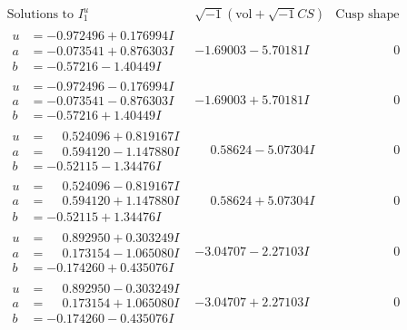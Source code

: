 \documentclass[1p]{elsarticle_modified}
\theoremstyle{definition}
\newcommand{\I}{\sqrt{-1}}
\begin{document}
$$\begin{array}{c|c|c}  
\text{Solutions to }I^u_{1}& \I (\text{vol} + \sqrt{-1}CS) & \text{Cusp shape}\\
 \hline 
\begin{aligned}
u &= -0.972496 + 0.176994 I \\
a &= -0.073541 + 0.876303 I \\
b &= -0.57216 - 1.40449 I\end{aligned}
 & -1.69003 - 5.70181 I & \phantom{-0.000000 } 0 \\ \hline\begin{aligned}
u &= -0.972496 - 0.176994 I \\
a &= -0.073541 - 0.876303 I \\
b &= -0.57216 + 1.40449 I\end{aligned}
 & -1.69003 + 5.70181 I & \phantom{-0.000000 } 0 \\ \hline\begin{aligned}
u &= \phantom{-}0.524096 + 0.819167 I \\
a &= \phantom{-}0.594120 - 1.147880 I \\
b &= -0.52115 - 1.34476 I\end{aligned}
 & \phantom{-}0.58624 - 5.07304 I & \phantom{-0.000000 } 0 \\ \hline\begin{aligned}
u &= \phantom{-}0.524096 - 0.819167 I \\
a &= \phantom{-}0.594120 + 1.147880 I \\
b &= -0.52115 + 1.34476 I\end{aligned}
 & \phantom{-}0.58624 + 5.07304 I & \phantom{-0.000000 } 0 \\ \hline\begin{aligned}
u &= \phantom{-}0.892950 + 0.303249 I \\
a &= \phantom{-}0.173154 - 1.065080 I \\
b &= -0.174260 + 0.435076 I\end{aligned}
 & -3.04707 - 2.27103 I & \phantom{-0.000000 } 0 \\ \hline\begin{aligned}
u &= \phantom{-}0.892950 - 0.303249 I \\
a &= \phantom{-}0.173154 + 1.065080 I \\
b &= -0.174260 - 0.435076 I\end{aligned}
 & -3.04707 + 2.27103 I & \phantom{-0.000000 } 0 \\ \hline\begin{aligned}

\end{aligned}
\end{array}$$
\end{document}
